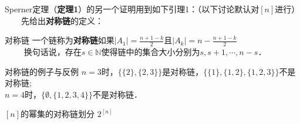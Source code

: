 Sperner定理（\textbf{定理1}）的另一个证明用到如下引理1：（以下讨论默认对$[n]$进行）\\
$\qquad$先给出\textbf{对称链}的定义：

\begin{definition}{对称链}
一个链称为\textbf{对称链}如果$|A_1|=\frac{n+1-k}{2}$且$|A_k|=n-\frac{n+1-k}{2}$\\
$\qquad$
换句话说，存在$s\in \mathbb{N}$使得链中的集合大小分别为$s,s+1,\cdots,n-s$．
\end{definition}

\begin{example}{对称链的例子与反例}
$n=3$时，$\{\{2\},\{2,3\}\}$是对称链，$\{\{1\},\{1,2\},\{1,2,3\}\}$不是对称链;\\
$n=4$时，$\{\emptyset,\{1,2,3,4\}\}$不是对称链．
\end{example}


\begin{lemma}{$[n]$的幂集的对称链划分}
$2^[n]$

\end{lemma}


